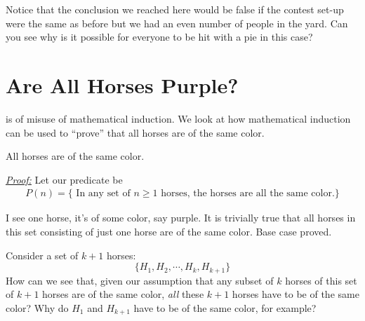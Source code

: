 \documentclass{tufte-handout}
\begin{document}
\bigskip
Notice that the conclusion we reached here would be false if the contest set-up were the same as before but we had an even number of people in the yard. Can you see why is it possible for everyone to be hit with a pie in this case?

\section{Are All Horses Purple?}

 is of misuse of mathematical induction.  We look at how mathematical induction can be used to ``prove'' that all horses are of the same color.

\bigskip
{} All horses are of the same color.

\textit{\underline{Proof:} } 
Let our predicate be
 \begin{equation*}
 \begin{aligned}
P(n) = \{ \text{ In any set of } n \geq 1  \text{ horses, the horses are all the same color.} \} %
\end{aligned}
\end{equation*}

 I see one horse, it's of some color, say purple. It is trivially true that all horses in this set consisting of just one horse are of the same color. Base case proved.

 Consider a set of $k+1$ horses:
$$
\{ H_1, H_2, \cdots, H_{k}, H_{k+1} \}
$$
How can we see that, given our assumption that any subset of $k$ horses of this set of $k+1$ horses are of the same color, \textit{all} these $k+1$ horses have to be of the same color? Why do $H_1$ and $H_{k+1}$ have to be of the same color, for example? 
\end{document}
